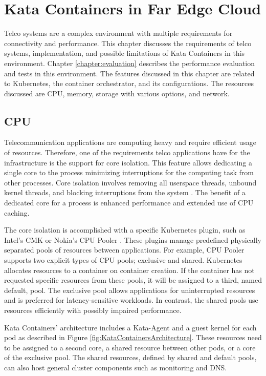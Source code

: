 \chapter{Kata Containers in Far Edge Cloud}
\label{chapter:implementation}

Telco systems are a complex environment with multiple requirements for connectivity and performance. This chapter discusses the requirements of telco systems, implementation, and possible limitations of Kata Containers in this environment. Chapter \ref{chapter:evaluation} describes the performance evaluation and tests in this environment. The features discussed in this chapter are related to Kubernetes, the container orchestrator, and its configurations. The resources discussed are CPU, memory, storage with various options, and network.

\section{CPU}

Telecommunication applications are computing heavy and require efficient usage of resources. Therefore, one of the requirements telco applications have for the infrastructure is the support for core isolation. This feature allows dedicating a single core to the process minimizing interruptions for the computing task from other processes. Core isolation involves removing all userspace threads, unbound kernel threads, and blocking interruptions from the system \cite{CPUisolation}. The benefit of a dedicated core for a process is enhanced performance and extended use of CPU caching.

The core isolation is accomplished with a specific Kubernetes plugin, such as Intel's CMK \cite{IntelCMK} or Nokia's CPU Pooler \cite{NokiaCPUPooler}. These plugins manage predefined physically separated pools of resources between applications. For example, CPU Pooler supports two explicit types of CPU pools; exclusive and shared. Kubernetes allocates resources to a container on container creation. If the container has not requested specific resources from these pools, it will be assigned to a third, named default, pool. The exclusive pool allows applications for uninterrupted resources and is preferred for latency-sensitive workloads. In contrast, the shared pools use resources efficiently with possibly impaired performance.

Kata Containers' architecture includes a Kata-Agent and a guest kernel for each pod as described in Figure \ref{fig:KataContainersArchitecture}. These resources need to be assigned to a second core, a shared resource between other pods, or a core of the exclusive pool. The shared resources, defined by shared and default pools, can also host general cluster components such as monitoring and DNS.

